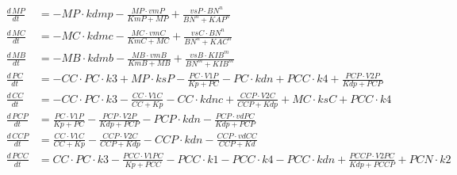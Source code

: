 \begin{table}[p]
  \centering
  \label{tab:leloupeqs}
  \footnotesize

  \begin{align*}
    \frac{d\,\mathit{MP}}{dt} &= - \mathit{MP} \cdot \mathit{kdmp} - \frac{\mathit{MP} \cdot \mathit{vmP}}{\mathit{KmP} + \mathit{MP}} + \frac{\mathit{vsP} \cdot {\mathit{BN}}^{\mathit{n}}}{{\mathit{BN}}^{\mathit{n}} + {\mathit{KAP}}^{\mathit{n}}}\\
    \frac{d\,\mathit{MC}}{dt} &= - \mathit{MC} \cdot \mathit{kdmc} - \frac{\mathit{MC} \cdot \mathit{vmC}}{\mathit{KmC} + \mathit{MC}} + \frac{\mathit{vsC} \cdot {\mathit{BN}}^{\mathit{n}}}{{\mathit{BN}}^{\mathit{n}} + {\mathit{KAC}}^{\mathit{n}}}\\
    \frac{d\,\mathit{MB}}{dt} &= - \mathit{MB} \cdot \mathit{kdmb} - \frac{\mathit{MB} \cdot \mathit{vmB}}{\mathit{KmB} + \mathit{MB}} + \frac{\mathit{vsB} \cdot {\mathit{KIB}}^{\mathit{m}}}{{\mathit{BN}}^{\mathit{m}} + {\mathit{KIB}}^{\mathit{m}}}\\
    \frac{d\,\mathit{PC}}{dt} &= - \mathit{CC} \cdot \mathit{PC} \cdot \mathit{k3} + \mathit{MP} \cdot \mathit{ksP} - \frac{\mathit{PC} \cdot \mathit{V1P}}{\mathit{Kp} + \mathit{PC}} - \mathit{PC} \cdot \mathit{kdn} + \mathit{PCC} \cdot \mathit{k4} + \frac{\mathit{PCP} \cdot \mathit{V2P}}{\mathit{Kdp} + \mathit{PCP}}\\
    \frac{d\,\mathit{CC}}{dt} &= - \mathit{CC} \cdot \mathit{PC} \cdot \mathit{k3} - \frac{\mathit{CC} \cdot \mathit{V1C}}{\mathit{CC} + \mathit{Kp}} - \mathit{CC} \cdot \mathit{kdnc} + \frac{\mathit{CCP} \cdot \mathit{V2C}}{\mathit{CCP} + \mathit{Kdp}} + \mathit{MC} \cdot \mathit{ksC} + \mathit{PCC} \cdot \mathit{k4}\\
    \frac{d\,\mathit{PCP}}{dt} &= \frac{\mathit{PC} \cdot \mathit{V1P}}{\mathit{Kp} + \mathit{PC}} - \frac{\mathit{PCP} \cdot \mathit{V2P}}{\mathit{Kdp} + \mathit{PCP}} - \mathit{PCP} \cdot \mathit{kdn} - \frac{\mathit{PCP} \cdot \mathit{vdPC}}{\mathit{Kdp} + \mathit{PCP}}\\
    \frac{d\,\mathit{CCP}}{dt} &= \frac{\mathit{CC} \cdot \mathit{V1C}}{\mathit{CC} + \mathit{Kp}} - \frac{\mathit{CCP} \cdot \mathit{V2C}}{\mathit{CCP} + \mathit{Kdp}} - \mathit{CCP} \cdot \mathit{kdn} - \frac{\mathit{CCP} \cdot \mathit{vdCC}}{\mathit{CCP} + \mathit{Kd}}\\
    \frac{d\,\mathit{PCC}}{dt} &= \mathit{CC} \cdot \mathit{PC} \cdot \mathit{k3} - \frac{\mathit{PCC} \cdot \mathit{V1PC}}{\mathit{Kp} + \mathit{PCC}} - \mathit{PCC} \cdot \mathit{k1} - \mathit{PCC} \cdot \mathit{k4} - \mathit{PCC} \cdot \mathit{kdn} + \frac{\mathit{PCCP} \cdot \mathit{V2PC}}{\mathit{Kdp} + \mathit{PCCP}} + \mathit{PCN} \cdot \mathit{k2}\\

\end{align*}
\end{table}

